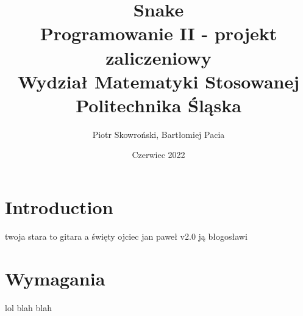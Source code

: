 \documentclass[12pt]{article}
\title{%
    Snake \\
    \large Programowanie II - projekt zaliczeniowy \\
    Wydział Matematyki Stosowanej \\
    Politechnika Śląska \\}
\author{Piotr Skowroński, Bartłomiej Pacia}
\date{Czerwiec 2022}
\begin{document}
\maketitle

\section{Introduction}

twoja stara to gitara a święty ojciec jan paweł v2.0 ją błogosławi

\section{Wymagania}

lol blah blah
\end{document}
